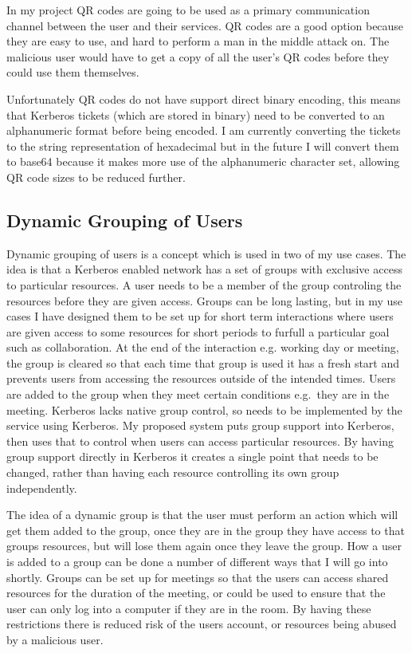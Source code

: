 \documentclass[]{report}   %
\begin{document}
In my project QR codes are going to be used as a primary communication channel between the user and their services. QR codes are a good option because they are easy to use, and hard to perform a man in the middle attack on. The malicious user would have to get a copy of all the user's QR codes before they could use them themselves.

Unfortunately QR codes do not have support direct binary encoding, this means that Kerberos tickets (which are stored in binary) need to be converted to an alphanumeric format before being encoded. I am currently converting the tickets to the string representation of hexadecimal but in the future I will convert them to base64 because it makes more use of the alphanumeric character set, allowing QR code sizes to be reduced further.

\subsection{Dynamic Grouping of Users}
Dynamic grouping of users is a concept which is used in two of my use cases. The idea is that a Kerberos enabled network has a set of groups with exclusive access to particular resources. A user needs to be a member of the group controling the resources before they are given access. Groups can be long lasting, but in my use cases I have designed them to be set up for short term interactions where users are given access to some resources for short periods to furfull a particular goal such as collaboration. At the end of the interaction e.g. working day or meeting, the group is cleared so that each time that group is used it has a fresh start and prevents users from accessing the resources outside of the intended times. Users are added to the group when they meet certain conditions e.g.\ they are in the meeting. Kerberos lacks native group control, so needs to be implemented by the service using Kerberos. My proposed system puts group support into Kerberos, then uses that to control when users can access particular resources. By having group support directly in Kerberos it creates a single point that needs to be changed, rather than having each resource controlling its own group independently.

The idea of a dynamic group is that the user must perform an action which will get them added to the group, once they are in the group they have access to that groups resources, but will lose them again once they leave the group. How a user is added to a group can be done a number of different ways that I will go into shortly. Groups can be set up for meetings so that the users can access shared resources for the duration of the meeting, or could be used to ensure that the user can only log into a computer if they are in the room. By having these restrictions there is reduced risk of the users account, or resources being abused by a malicious user.
\end{document}
